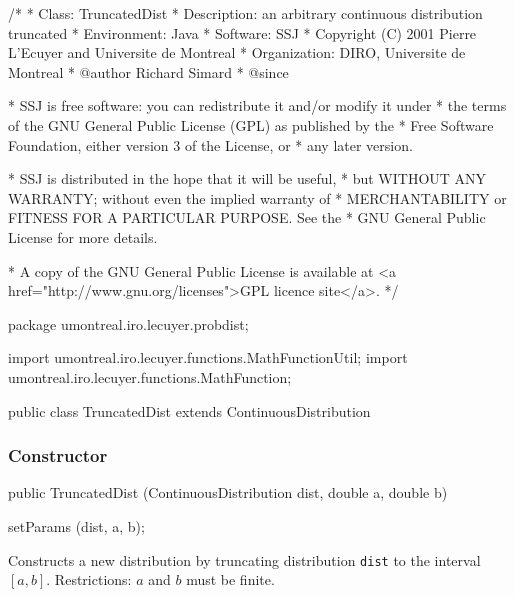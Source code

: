 \begin{code}
\begin{hide}
/*
 * Class:        TruncatedDist
 * Description:  an arbitrary continuous distribution truncated
 * Environment:  Java
 * Software:     SSJ
 * Copyright (C) 2001  Pierre L'Ecuyer and Universite de Montreal
 * Organization: DIRO, Universite de Montreal
 * @author       Richard Simard
 * @since

 * SSJ is free software: you can redistribute it and/or modify it under
 * the terms of the GNU General Public License (GPL) as published by the
 * Free Software Foundation, either version 3 of the License, or
 * any later version.

 * SSJ is distributed in the hope that it will be useful,
 * but WITHOUT ANY WARRANTY; without even the implied warranty of
 * MERCHANTABILITY or FITNESS FOR A PARTICULAR PURPOSE.  See the
 * GNU General Public License for more details.

 * A copy of the GNU General Public License is available at
   <a href="http://www.gnu.org/licenses">GPL licence site</a>.
 */
\end{hide}
package umontreal.iro.lecuyer.probdist;\begin{hide}
import umontreal.iro.lecuyer.functions.MathFunctionUtil;
import umontreal.iro.lecuyer.functions.MathFunction;
\end{hide}

public class TruncatedDist extends ContinuousDistribution\begin{hide} {
   public static int NUMINTERVALS = 500;

   private ContinuousDistribution dist0;  // The original (non-truncated) dist.
   private double fa;                    // F(a)
   private double fb;                    // F(b)
   private double barfb;                 // bar F(b)
   private double fbfa;                  // F(b) - F(a)
   private double a;
   private double b;
   private double approxMean;
   private double approxVariance;
   private double approxStandardDeviation;\end{hide}
\end{code}
\subsubsection* {Constructor}

\begin{code}

   public TruncatedDist (ContinuousDistribution dist, double a, double b)\begin{hide} {
      setParams (dist, a, b);
   }\end{hide}
\end{code}
\begin{tabb}
  Constructs a new distribution by truncating distribution \texttt{dist}
  to the interval $[a,b]$. Restrictions: $a$ and $b$ must be finite.
\end{tabb}

